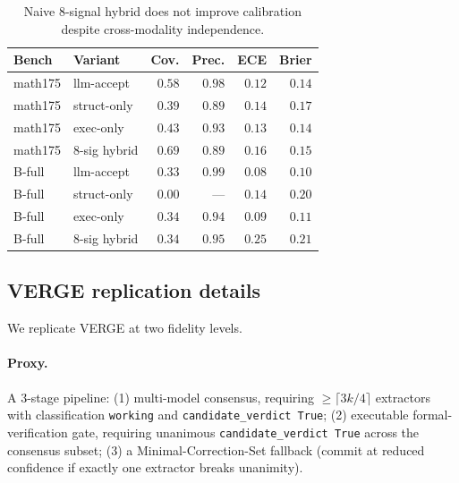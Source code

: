 \begin{table}[h]
\centering
\caption{Naive 8-signal hybrid does not improve calibration despite
cross-modality independence.}
\label{tab:hybrid_naive}
\small
\setlength{\tabcolsep}{4pt}
\begin{tabular}{llrrrr}
\toprule
Bench    & Variant       & Cov.  & Prec. & ECE   & Brier  \\
\midrule
math175  & llm-accept    & $0.58$ & $0.98$ & $0.12$ & $0.14$ \\
math175  & struct-only   & $0.39$ & $0.89$ & $0.14$ & $0.17$ \\
math175  & exec-only     & $0.43$ & $0.93$ & $0.13$ & $0.14$ \\
math175  & 8-sig hybrid  & $0.69$ & $0.89$ & $0.16$ & $0.15$ \\
\midrule
B-full   & llm-accept    & $0.33$ & $0.99$ & $0.08$ & $0.10$ \\
B-full   & struct-only   & $0.00$ & ---    & $0.14$ & $0.20$ \\
B-full   & exec-only     & $0.34$ & $0.94$ & $0.09$ & $0.11$ \\
B-full   & 8-sig hybrid  & $0.34$ & $0.95$ & $0.25$ & $0.21$ \\
\bottomrule
\end{tabular}
\end{table}

\subsection{VERGE replication details}
\label{app:verge_proxy}

We replicate VERGE \citep{singh2026verge} at two fidelity levels.

\paragraph{Proxy.}
A 3-stage pipeline: (1) multi-model consensus, requiring
$\geq \lceil 3k/4 \rceil$ extractors with classification
\texttt{working} and \texttt{candidate\_verdict True};
(2) executable formal-verification gate, requiring unanimous
\texttt{candidate\_verdict True} across the consensus subset;
(3) a Minimal-Correction-Set fallback (commit at reduced confidence if
exactly one extractor breaks unanimity).


